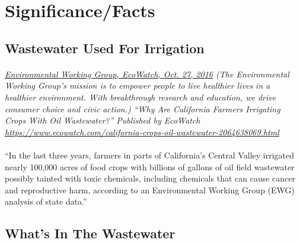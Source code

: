 \documentclass{article}
\begin{document}
\section{Significance/Facts}

\subsection{Wastewater Used For Irrigation}
\paragraph{}
\small
\textit{
\underline{Environmental Working Group, EcoWatch, Oct. 27, 2016}
(The Environmental Working Group’s mission is to empower people to live healthier lives in a healthier environment. With breakthrough research and education, we drive consumer choice and civic action.) “Why Are California Farmers Irrigating Crops With Oil Wastewater?” Published by EcoWatch \url{https://www.ecowatch.com/california-crops-oil-wastewater-2064638069.html}}
\normalsize
\paragraph{}
``In the last three years, farmers in parts of California's Central Valley irrigated nearly 100,000 acres of food crops with billions of gallons of oil field wastewater possibly tainted with toxic chemicals, including chemicals that can cause cancer and reproductive harm, according to an Environmental Working Group (EWG) analysis of state data.”

\subsection{What's In The Wastewater}
\end{document}
